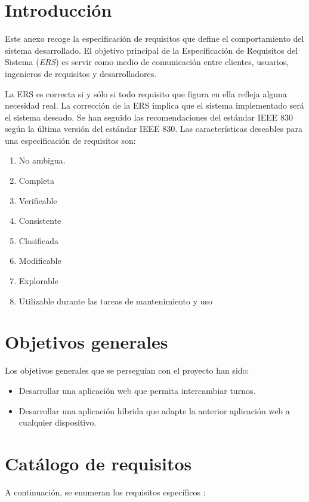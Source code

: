 
\section{Introducción}\label{introduccion-requisitos}

Este anexo recoge la especificación de requisitos que define el comportamiento del sistema desarrollado. El objetivo principal de la Especificación de Requisitos del Sistema (\emph{ERS}) es servir como medio de comunicación entre clientes, usuarios, ingenieros de requisitos y desarrolladores.

La ERS es correcta si y sólo si todo requisito que figura en ella refleja alguna necesidad
real. La corrección de la ERS implica que el sistema implementado será el sistema
deseado. Se han seguido las recomendaciones del estándar IEEE 830 según la última versión del estándar IEEE 830. Las características deseables para una especificación de requisitos son:


\begin{enumerate}
	\item No ambigua.
	\item Completa
	\item  Verificable
	\item  Consistente
	\item  Clasificada
	\item  Modificable
	\item  Explorable
	\item  Utilizable durante las tareas de mantenimiento y uso
\end{enumerate}


\section{Objetivos generales}\label{objetivos-generales}
Los objetivos generales que se perseguían con el proyecto han sido:
\begin{itemize}
	\item Desarrollar una aplicación web que permita intercambiar turnos.
	\item Desarrollar una aplicación híbrida que adapte la anterior aplicación web a cualquier dispositivo.
\end{itemize}


\section{Catálogo de requisitos}\label{catalogo-requisitos}
A continuación, se enumeran los requisitos específicos :


